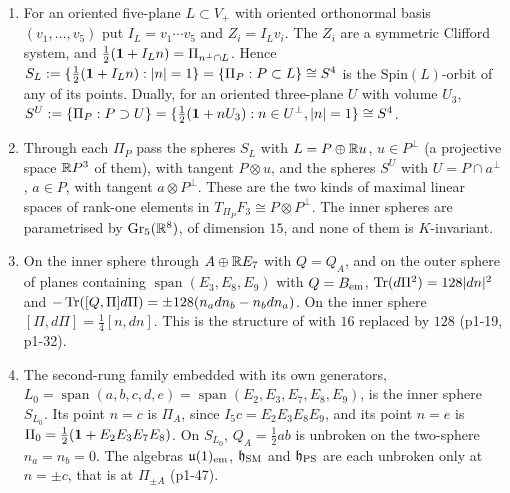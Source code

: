 \begin{proposition}
\label{p1:prop:spheres}
\begin{enumerate}[label=(\roman*),leftmargin=2.2em]
\item For an oriented five-plane $L\subset V_+$ with oriented orthonormal basis $(v_1,\dots,v_5)$ put $I_L=v_1\cdots v_5$ and $Z_i=I_Lv_i$. The $Z_i$ are a symmetric Clifford
system, and $\tfrac12(\mathbf 1+I_Ln)=\Pi_{n^\perp\cap L}$. Hence $S_L:=\{\tfrac12(\mathbf 1+I_Ln):|n|=1\}=\{\Pi_P:P\subset L\}\cong S^4$ is the $\mathrm{Spin}(L)$-orbit of any of its points.
Dually, for an oriented three-plane $U$ with volume $U_3$, $S^U:=\{\Pi_P:P\supset U\}=\{\tfrac12(\mathbf 1+nU_3):n\in U^\perp,|n|=1\}\cong S^4$.
\item Through each $\Pi_P$ pass the spheres $S_L$ with $L=P\oplus\mathbb{R} u$, $u\in P^\perp$ (a projective space $\mathbb{R} P^3$ of them), with tangent $P\otimes u$, and the spheres $S^U$
with $U=P\cap a^\perp$, $a\in P$, with tangent $a\otimes P^\perp$. These are the two kinds of maximal linear spaces of rank-one elements in $T_{\Pi_P}F_3\cong P\otimes P^\perp$. The
inner spheres are parametrised by $\mathrm{Gr}_5(\mathbb{R}^8)$, of dimension $15$, and none of them is $K$-invariant.
\item On the inner sphere through $A\oplus\mathbb{R} E_7$ with $Q=Q_A$, and on the outer sphere of planes containing $\operatorname{span}(E_3,E_8,E_9)$ with $Q=B_{\rm em}$,
$\operatorname{Tr}(d\Pi^2)=128|dn|^2$ and $-\operatorname{Tr}([Q,\Pi]d\Pi)=\pm128(n_adn_b-n_bdn_a)$. On the inner sphere $[\Pi,d\Pi]=\tfrac14[n,dn]$. This is the structure of
\cite[Thms.~26.7, 26.8]{ES17} with $16$ replaced by $128$ (p1-19, p1-32).
\item The second-rung family embedded with its own generators, $L_0=\operatorname{span}(a,b,c,d,e)=\operatorname{span}(E_2,E_3,E_7,E_8,E_9)$, is the inner sphere $S_{L_0}$. Its
point $n=c$ is $\Pi_A$, since $I_5c=E_2E_3E_8E_9$, and its point $n=e$ is $\Pi_0=\tfrac12(\mathbf 1+E_2E_3E_7E_8)$. On $S_{L_0}$, $Q_A=\tfrac12ab$ is unbroken on the two-sphere
$n_a=n_b=0$. The algebras $\mathfrak{u}(1)_{\rm em}$, $\mathfrak h_{\rm SM}$ and $\mathfrak h_{\rm PS}$ are each unbroken only at $n=\pm c$, that is at $\Pi_{\pm A}$ (p1-47).
\end{enumerate}
\end{proposition}

